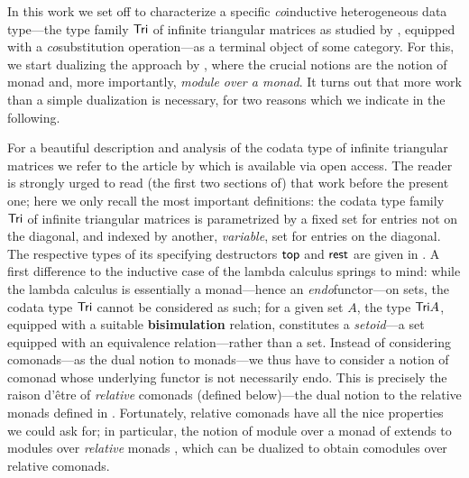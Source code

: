 \documentclass{amsart}
\newcommand{\fat}[1]{\textbf{#1}}
\begin{document}
 

 In this work we set off to characterize a specific \emph{co}inductive heterogeneous data type---the type family $\mathsf{Tri}$ of 
 infinite triangular matrices as studied by \textcite{DBLP:conf/types/MatthesP11}, equipped with a \emph{co}substitution operation---as a terminal object of some 
 category. For this, we start dualizing the approach by \textcite{DBLP:journals/iandc/HirschowitzM10}, where 
 the crucial notions are the notion of monad and, more importantly, \emph{module over a monad}.
 It turns out that more work than a simple dualization is necessary, for two reasons which we indicate in the following.
 
  
 For a beautiful description and analysis of the codata type of infinite triangular matrices we refer to the article by
 \textcite{DBLP:conf/types/MatthesP11} which is available via open access. The reader is strongly urged to read (the first two sections of) that work 
 before the present one; here we only recall the most important
 definitions:
 the codata type family $\mathsf{Tri}$ of infinite triangular matrices is parametrized by a fixed set for entries not on the diagonal, 
 and indexed by another, \emph{variable}, set for entries on 
 the diagonal. The respective types of its specifying destructors $\mathsf{top}$ and $\mathsf{rest}$ are given in .
 A first difference to the inductive case of the lambda calculus springs to mind:
 while the lambda calculus is essentially a monad---hence an \emph{endo}functor---on sets, the codata type $\mathsf{Tri}$ cannot be considered as such;
 for a given set $A$, the type $\mathsf{Tri} A$, equipped with a suitable \fat{bisimulation} relation, 
 constitutes a \emph{setoid}---a set equipped with an equivalence relation---rather than a set.
 Instead of considering comonads---as the dual notion to monads---we thus have to consider a notion of comonad whose underlying functor is not necessarily endo.
 This is precisely the raison d'\^etre of \emph{relative} comonads (defined below)---the dual notion to the relative monads defined in 
  \parencite{DBLP:conf/fossacs/AltenkirchCU10}. 
 Fortunately, relative comonads have all the nice properties we could ask for; 
 in particular, the notion of module over a monad of \parencite{DBLP:journals/iandc/HirschowitzM10} extends to modules over \emph{relative} monads
 \parencite{ahrens_relmonads}, which can be dualized to obtain comodules over relative comonads.
 
\end{document}
